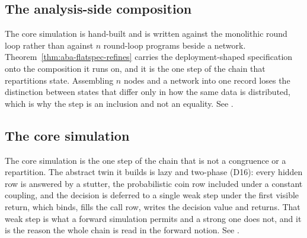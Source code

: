 



\subsection{The analysis-side composition}

The core simulation is hand-built and is written against the monolithic round loop rather than against $n$ round-loop programs beside a network.
Theorem~\ref{thm:aba-flatspec-refines} carries the deployment-shaped specification onto the composition it runs on, and it is the one step of the chain that repartitions state.
Assembling $n$ nodes and a network into one record loses the distinction between states that differ only in how the same data is distributed, which is why the step is an inclusion and not an equality.
See .






\subsection{The core simulation}

The core simulation is the one step of the chain that is not a congruence or a repartition.
The abstract twin it builds is lazy and two-phase (D16): every hidden row is answered by a stutter, the probabilistic coin row included under a constant coupling, and the decision is deferred to a single weak step under the first visible return, which binds, fills the call row, writes the decision value and returns.
That weak step is what a forward simulation permits and a strong one does not, and it is the reason the whole chain is read in the forward notion.
See .



